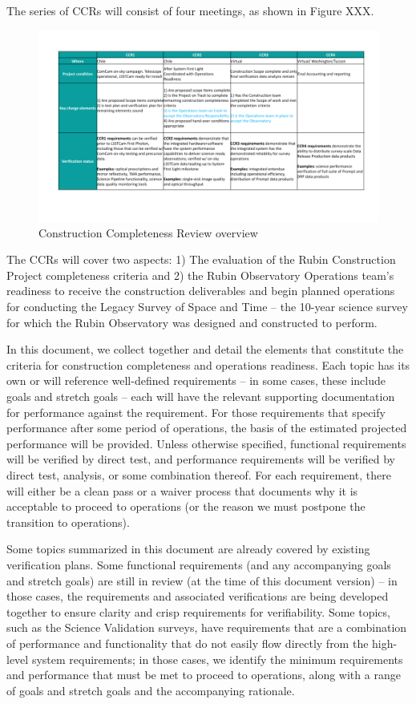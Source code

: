 The series of CCRs will consist of four meetings, as shown in Figure XXX.
\begin{figure}[htbp]
\begin{center}
\includegraphics[width=1\textwidth]{./CCRs_overview.png}
\caption{Construction Completeness Review overview}
\label{CCRs_overview}
\end{center}
\end{figure}


The CCRs will cover two aspects: 
 1) The evaluation of the Rubin Construction Project completeness criteria and 
 2) the Rubin Observatory Operations team's readiness to receive the construction deliverables and begin planned operations for conducting the Legacy Survey of Space and Time -- the 10-year science survey for which the Rubin Observatory was designed and constructed to perform.

In this document, we collect together and detail the elements that constitute the criteria for construction completeness and operations readiness. 
Each topic has its own or will reference well-defined requirements -- in some cases, these include goals and stretch goals -- each will have the relevant supporting documentation for performance against the requirement. For those requirements that specify performance after some period of operations, the basis of the estimated projected performance will be provided. Unless otherwise specified, functional requirements will be verified by direct test, and performance requirements will be verified by direct test, analysis, or some combination thereof.  For each requirement, there will either be a clean pass or a waiver process that documents why it is acceptable to proceed to operations (or the reason we must postpone the transition to operations).

Some topics summarized in this document are already covered by existing verification plans.  Some functional requirements (and any accompanying goals and stretch goals) are still in review (at the time of this document version) -- in those cases, the requirements and associated verifications are being developed together to ensure clarity and crisp requirements for verifiability. Some topics, such as the Science Validation surveys, have requirements that are a combination of performance and functionality that do not easily flow directly from the high-level system requirements; in those cases, we identify the minimum requirements and performance that must be met to proceed to operations, along with a range of goals and stretch goals and the accompanying rationale.

